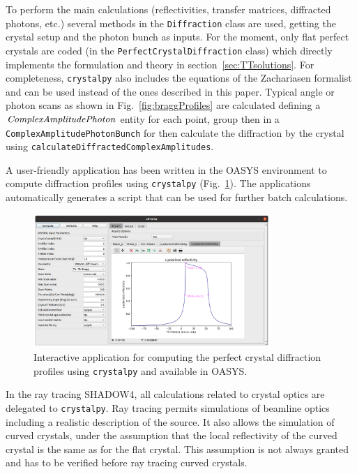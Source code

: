 \documentclass[preprint]{iucr}              %
\newcommand{\todo}[1]{{\color{red}[TODO: "#1'']}}
\begin{document}
To perform the main calculations (reflectivities, transfer matrices, diffracted photons, etc.) several methods in the {\tt Diffraction} class are used, getting the crystal setup and the photon bunch as inputs. For the moment, only flat perfect crystals are coded (in the {\tt PerfectCrystalDiffraction} class) which directly implements the formulation and theory in section~\ref{sec:TTsolutions}. For completeness, {\tt crystalpy} also includes the equations of the Zachariasen formalist~\cite{ZachariasenBook} and can be used instead of the ones described in this paper.
Typical angle or photon scans as shown in Fig.~\ref{fig:braggProfiles} are calculated defining a $\tt ComplexAmplitudePhoton$ entity for each point, group then in a {\tt ComplexAmplitudePhotonBunch} for then calculate the diffraction by the crystal using {\tt calculateDiffractedComplexAmplitudes}.

A user-friendly application has been written in the OASYS environment to compute diffraction profiles using {\tt crystalpy} (Fig.~\ref{fig:xcrystal}). The applications automatically generates a script that can be used for further batch calculations. 

\begin{figure}
    \centering
    \includegraphics[width=0.8\textwidth]{figures/xcrystal.png}
    \caption{Interactive application for computing the perfect crystal diffraction profiles using {\tt crystalpy} and available in OASYS.  }
    \label{fig:xcrystal}
\end{figure}

In the ray tracing SHADOW4, all calculations related to crystal optics are delegated to  {\tt crystalpy}. Ray tracing permits simulations of beamline optics including a realistic description of the source. It also allows the simulation of curved crystals, under the assumption that the local reflectivity of the curved crystal is the same as for the flat crystal. This assumption is not always granted and has to be verified before ray tracing curved crystals.
\end{document}

